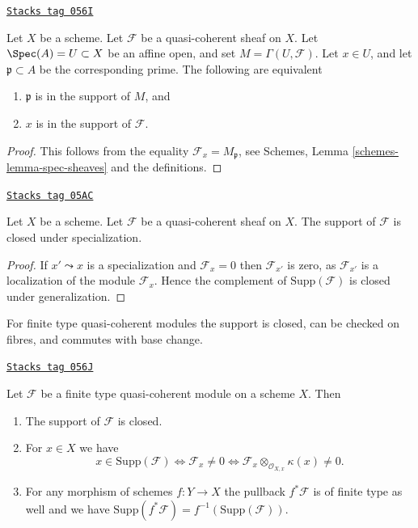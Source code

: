 \begin{lemma}
\label{morphisms-lemma-support-affine-open}
\href{https://stacks.math.columbia.edu/tag/056I}{\texttt{Stacks tag 056I}}

Let $X$ be a scheme. Let $\mathcal{F}$ be a quasi-coherent sheaf on $X$.
Let $\Spec(A) = U \subset X$ be an affine open, and set
$M = \Gamma(U, \mathcal{F})$.
Let $x \in U$, and let $\mathfrak p \subset A$ be the corresponding prime.
The following are equivalent
\begin{enumerate}
\item $\mathfrak p$ is in the support of $M$, and
\item $x$ is in the support of $\mathcal{F}$.
\end{enumerate}
\end{lemma}

\begin{proof}
This follows from the equality $\mathcal{F}_x = M_{\mathfrak p}$, see
Schemes, Lemma \ref{schemes-lemma-spec-sheaves}
and the definitions.
\end{proof}

\begin{lemma}
\label{morphisms-lemma-support-closed-specialization}
\href{https://stacks.math.columbia.edu/tag/05AC}{\texttt{Stacks tag 05AC}}

Let $X$ be a scheme.
Let $\mathcal{F}$ be a quasi-coherent sheaf on $X$.
The support of $\mathcal{F}$ is closed under specialization.
\end{lemma}

\begin{proof}
If $x' \leadsto x$ is a specialization and $\mathcal{F}_x = 0$
then $\mathcal{F}_{x'}$ is zero, as $\mathcal{F}_{x'}$ is a localization
of the module $\mathcal{F}_x$. Hence the complement of
$\text{Supp}(\mathcal{F})$ is closed under generalization.
\end{proof}

For finite type quasi-coherent modules the support is closed,
can be checked on fibres, and commutes with base change.

\begin{lemma}
\label{morphisms-lemma-support-finite-type}
\href{https://stacks.math.columbia.edu/tag/056J}{\texttt{Stacks tag 056J}}

Let $\mathcal{F}$ be a finite type quasi-coherent module
on a scheme $X$. Then
\begin{enumerate}
\item The support of $\mathcal{F}$ is closed.
\item For $x \in X$ we have
$$
x \in \text{Supp}(\mathcal{F})
\Leftrightarrow
\mathcal{F}_x \not = 0
\Leftrightarrow
\mathcal{F}_x \otimes_{\mathcal{O}_{X, x}} \kappa(x) \not = 0.
$$
\item For any morphism of schemes $f : Y \to X$ the pullback
$f^*\mathcal{F}$ is of finite type as well and we have
$\text{Supp}(f^*\mathcal{F}) = f^{-1}(\text{Supp}(\mathcal{F}))$.
\end{enumerate}
\end{lemma}


